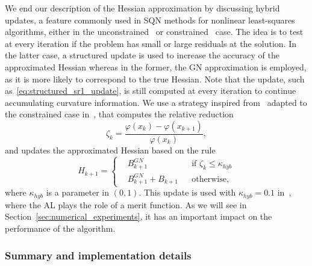 We end our description of the Hessian approximation by discussing hybrid updates, a feature commonly used in SQN methods for nonlinear least-squares algorithms, either in the unconstrained~\cite{dennisetal:1981,albaalifletcher:1985,fletcherxu:1987} or constrained~\cite{tjoabiegler:1991,li-etal:2002} case. The idea is to test at every iteration if the problem has small or large residuals at the solution. In the latter case, a structured update is used to increase the accuracy of the approximated Hessian whereas in the former, the GN approximation is employed, as it is more likely to correspond to the true Hessian. Note that the update, such as~\eqref{eq:structured_sr1_update}, is still computed at every iteration to continue accumulating curvature information. We use a strategy inspired from~\cite{fletcherxu:1987} adapted to the constrained case in~\cite{tjoabiegler:1991}, that computes the relative reduction
\begin{equation*}
	\zeta_k = \dfrac{\varphi(x_{k})-\varphi(x_{k+1})}{\varphi(x_{k})},
\end{equation*}
and updates the approximated Hessian based on the rule
\begin{equation}\label{eq:hybrid_update_strategy}
	H_{k+1} = \left\{\begin{aligned}
		&B^{GN}_{k+1} & &\text{if } \zeta_k \le \kappa_{hyb} \\
		&B^{GN}_{k+1} + B_{k+1} & & \text{otherwise}, 
	\end{aligned}\right.
\end{equation}
where $\kappa_{hyb}$ is a parameter in $(0,1)$. This update is used with $\kappa_{hyb}=0.1$ in~\cite{tjoabiegler:1991}, where the AL plays the role of a merit function. As we will see in Section~\ref{sec:numerical_experiments}, it has an important impact on the performance of the algorithm.

\subsubsection{Summary and implementation details}\label{subsec:implementation_details}

